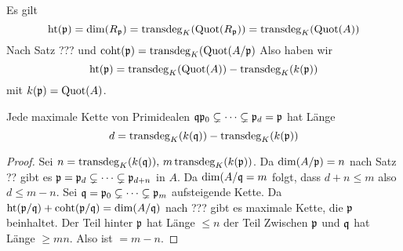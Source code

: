 \begin{Bem} Es gilt \[ \mathrm{ht}(\mathfrak{p})=\dim(R_{\mathfrak{p}})=\operatorname{transdeg}_K(\operatorname{Quot}(R_{\mathfrak{p}}))=\operatorname{transdeg}_K(\operatorname{Quot}(A))\] Nach Satz ???
	und \( \mathrm{coht}(\mathfrak{p})=\operatorname{transdeg}_K(\operatorname{Quot}(A/\mathfrak{p}) \) 
	Also haben wir 
	\[ \mathrm{ht}(\mathfrak{p})=\operatorname{transdeg}_K(\operatorname{Quot}(A))-\operatorname{transdeg}_K(k(\mathfrak{p}))\] mit \(k(\mathfrak{p})=\operatorname{Quot}(A)\).
	
\end{Bem}
\begin{Satz} Jede maximale Kette von Primidealen \( \mathfrak{q}\mathfrak{p}_0 \subsetneq \dots \subsetneq \mathfrak{p}_d =\mathfrak{p} \)
	hat Länge 
	\[ d = \operatorname{transdeg}_K(k(\mathfrak{q}))-\operatorname{transdeg}_K(k(\mathfrak{p}))\]
	
\end{Satz}
\begin{proof}
	Sei \( n=\operatorname{transdeg}_K(k(\mathfrak{q})),\, m\operatorname{transdeg}_K(k(\mathfrak{p}))\). Da \( \dim(A/\mathfrak{p})=n \) nach Satz ??
	gibt es \( \mathfrak{p}=\mathfrak{p}_d\subsetneq \dots \subsetneq \mathfrak{p}_{d+n}\) in \(A\). Da \( \dim(A/\mathfrak{q} = m\) folgt, dass
	\( d+n \leq m \) also \( d\leq m-n \).
	Sei \(\mathfrak{q}=\mathfrak{p}_0\subsetneq \dots \subsetneq \mathfrak{p}_m \) aufsteigende Kette.
	Da \( \mathrm{ht}(\mathfrak{p}/\mathfrak{q})+\mathrm{coht}(\mathfrak{p}/\mathfrak{q})=\dim(A/\mathfrak{q})\) nach ??? gibt es maximale Kette, die \(\mathfrak{p} \) beinhaltet.
	Der Teil hinter \( \mathfrak{p} \) hat Länge \(\leq n \) der Teil Zwischen \(\mathfrak{p} \) und \(\mathfrak{q} \) hat Länge \(\geq mn\).
	Also ist \( = m-n\).
\end{proof}